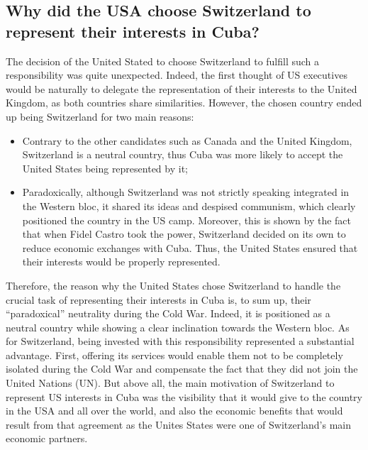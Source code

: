 \documentclass[a4paper]{article}
\begin{document}
\subsection{Why did the USA choose Switzerland to represent their interests in Cuba?}
The decision of the United Stated to choose Switzerland to fulfill such a responsibility was quite unexpected. Indeed, the first thought of US executives would be naturally to delegate the representation of their interests to the United Kingdom, as both countries share similarities. 
However, the chosen country ended up being Switzerland for two main reasons:
\begin{itemize}
\item Contrary to the other candidates such as Canada and the United Kingdom, Switzerland is a neutral country, thus Cuba was more likely to accept the United States being represented by it;
\item Paradoxically, although Switzerland was not strictly speaking integrated in the Western bloc, it shared its ideas and despised communism, which clearly positioned the country in the US camp. Moreover, this is shown by the fact that when Fidel Castro took the power, Switzerland decided on its own to reduce economic exchanges with Cuba. Thus, the United States ensured that their interests would be properly represented. 
\end{itemize}
Therefore, the reason why the United States chose Switzerland to handle the crucial task of representing their interests in Cuba is, to sum up, their “paradoxical” neutrality during the Cold War. Indeed, it is positioned as a neutral country while showing a clear inclination towards the Western bloc. 
As for Switzerland, being invested with this responsibility represented a substantial advantage. First, offering its services would enable them not to be completely isolated during the Cold War and compensate the fact that they did not join the United Nations (UN). But above all, the main motivation of Switzerland to represent US interests in Cuba was the visibility that it would give to the country in the USA and all over the world, and also the economic benefits that would result from that agreement as the Unites States were one of Switzerland’s main economic partners. 
\end{document}
